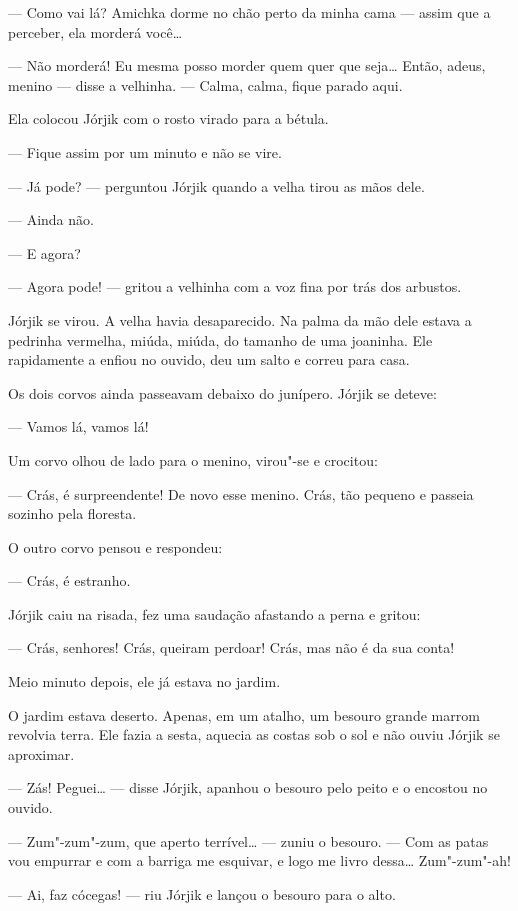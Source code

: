 --- Como vai lá? Amichka dorme no chão perto da minha cama --- assim que
a perceber, ela morderá você\ldots{}

--- Não morderá! Eu mesma posso morder quem quer que seja\ldots{} Então,
adeus, menino --- disse a velhinha. --- Calma, calma, fique parado aqui.

Ela colocou Jórjik com o rosto virado para a bétula.

--- Fique assim por um minuto e não se vire.

--- Já pode? --- perguntou Jórjik quando a velha tirou as mãos dele.

--- Ainda não.

--- E agora?

--- Agora pode! --- gritou a velhinha com a voz fina por trás dos
arbustos.

Jórjik se virou. A velha havia desaparecido. Na palma da mão dele estava
a pedrinha vermelha, miúda, miúda, do tamanho de uma joaninha. Ele
rapidamente a enfiou no ouvido, deu um salto e correu para casa.

Os dois corvos ainda passeavam debaixo do junípero. Jórjik se deteve:

--- Vamos lá, vamos lá!

Um corvo olhou de lado para o menino, virou"-se e crocitou:

--- Crás, é surpreendente! De novo esse menino. Crás, tão pequeno e
passeia sozinho pela floresta.

O outro corvo pensou e respondeu:

--- Crás, é estranho.

Jórjik caiu na risada, fez uma saudação afastando a perna e gritou:

--- Crás, senhores! Crás, queiram perdoar! Crás, mas não é da sua conta!

Meio minuto depois, ele já estava no jardim.

O jardim estava deserto. Apenas, em um atalho, um besouro grande marrom
revolvia terra. Ele fazia a sesta, aquecia as costas sob o sol e não
ouviu Jórjik se aproximar.

--- Zás! Peguei\ldots{} --- disse Jórjik, apanhou o besouro pelo peito e o
encostou no ouvido.

--- Zum"-zum"-zum, que aperto terrível\ldots{} --- zuniu o besouro. --- Com as
patas vou empurrar e com a barriga me esquivar, e logo me livro dessa\ldots{}
Zum"-zum"-ah!

--- Ai, faz cócegas! --- riu Jórjik e lançou o besouro para o alto.

